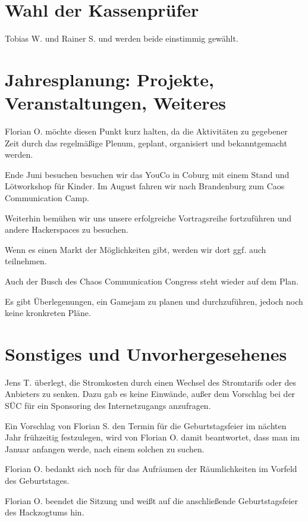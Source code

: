\section{Wahl der Kassenprüfer}
 Tobias W. und Rainer S. und werden beide einstimmig gewählt. 
 
\section{Jahresplanung: Projekte, Veranstaltungen, Weiteres}
Florian O. möchte diesen Punkt kurz halten, da die Aktivitäten zu gegebener Zeit durch das regelmäßige Plenum, geplant, organisiert und bekanntgemacht werden. 

Ende Juni besuchen besuchen wir das YouCo in Coburg mit einem Stand und Lötworkshop für Kinder.
Im August fahren wir nach Brandenburg zum Caos Communication Camp.

Weiterhin bemühen wir uns unsere erfolgreiche Vortragsreihe fortzuführen und andere Hackerspaces zu besuchen.

Wenn es einen Markt der Möglichkeiten gibt, werden wir dort ggf. auch teilnehmen.

Auch der Busch des Chaos Communication Congress steht wieder auf dem Plan.

Es gibt Überlegenungen, ein Gamejam zu planen und durchzuführen, jedoch noch keine kronkreten Pläne.

 
\section{Sonstiges und Unvorhergesehenes}
Jens T. überlegt, die Stromkosten durch einen Wechsel des Stromtarifs oder des Anbieters zu senken.
Dazu gab es keine Einwände, außer dem Vorschlag bei der SÜC für ein Sponsoring des Internetzugangs anzufragen.

Ein Vorschlag von Florian S. den Termin für die Geburtstagsfeier im nächten Jahr frühzeitig festzulegen, wird von Florian O. damit beantwortet, dass man im Januar anfangen werde, nach einem solchen zu suchen.

Florian O. bedankt sich noch für das Aufräumen der Räumlichkeiten im Vorfeld des Geburtstages.

Florian O. beendet die Sitzung und weißt auf die anschließende Geburtstagsfeier des Hackzogtums hin. 
